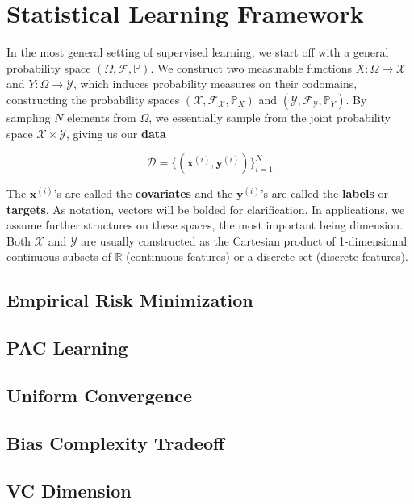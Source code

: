 \documentclass{article}
\theoremstyle{definition}
\begin{document}
\section{Statistical Learning Framework}

  In the most general setting of supervised learning, we start off with a general probability space $(\Omega, \mathcal{F}, \mathbb{P})$. We construct two measurable functions $X: \Omega \rightarrow \mathcal{X}$ and $Y: \Omega \rightarrow \mathcal{Y}$, which induces probability measures on their codomains, constructing the probability spaces $(\mathcal{X}, \mathcal{F}_{\mathcal{X}}, \mathbb{P}_X)$ and $(\mathcal{Y}, \mathcal{F}_{\mathcal{Y}}, \mathbb{P}_Y)$. By sampling $N$ elements from $\Omega$, we essentially sample from the joint probability space $\mathcal{X} \times \mathcal{Y}$, giving us our \textbf{data} 

    \[\mathcal{D} = \{(\mathbf{x}^{(i)}, \mathbf{y}^{(i)}) \}_{i=1}^N\]

  The $\mathbf{x}^{(i)}$'s are called the \textbf{covariates} and the $\mathbf{y}^{(i)}$'s are called the \textbf{labels} or \textbf{targets}. As notation, vectors will be bolded for clarification. In applications, we assume further structures on these spaces, the most important being dimension. Both $\mathcal{X}$ and $\mathcal{Y}$ are usually constructed as the Cartesian product of 1-dimensional continuous subsets of $\mathbb{R}$ (continuous features) or a discrete set (discrete features). 

  \subsection{Empirical Risk Minimization}

  \subsection{PAC Learning}

  \subsection{Uniform Convergence}

  \subsection{Bias Complexity Tradeoff}

  \subsection{VC Dimension}
\end{document}
